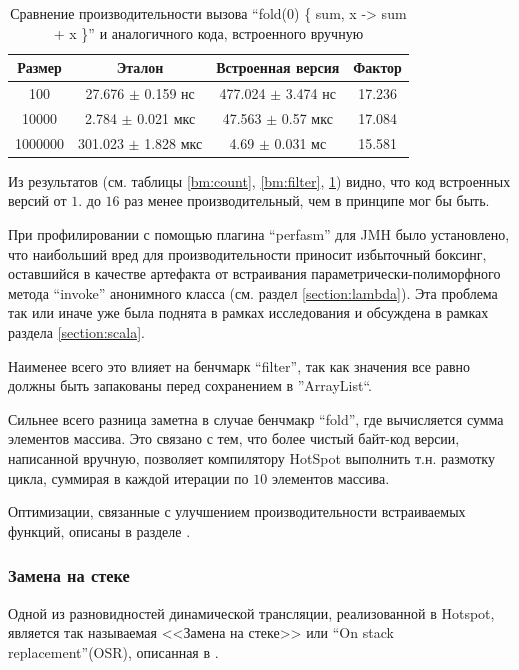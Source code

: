 \begin{table}[h]
\begin{center}
\begin{tabular}{|c|c|c|c|} \hline
Размер & Эталон & Встроенная версия & Фактор \\ \hline
100 & 27.676 $\pm$ 0.159 нс & 477.024 $\pm$ 3.474 нс & 17.236\\ \hline
10000 & 2.784 $\pm$ 0.021 мкс & 47.563 $\pm$ 0.57 мкс & 17.084\\ \hline
1000000 & 301.023 $\pm$ 1.828 мкс & 4.69 $\pm$ 0.031 мс & 15.581\\ \hline
\end{tabular}
\caption{Сравнение производительности вызова ``fold(0) \{ sum, x -> sum + x \}'' и аналогичного кода, встроенного вручную}
\label{bm:fold}
\end{center}
\end{table}

Из результатов (см. таблицы \ref{bm:count}, \ref{bm:filter}, \ref{bm:fold}) видно, что код
встроенных версий от $1.$ до $16$ раз менее производительный, чем в принципе мог бы быть.

При профилировании с помощью плагина ``perfasm'' для JMH было установлено, что наибольший вред
для производительности приносит избыточный боксинг, оставшийся в качестве артефакта от встраивания
параметрически-полиморфного метода ``invoke'' анонимного класса (см. раздел \ref{section:lambda}).
Эта проблема так или иначе уже была поднята в рамках исследования\cite{ScalaDragos} и обсуждена
в рамках раздела \ref{section:scala}.

Наименее всего это влияет на бенчмарк ``filter'', так как значения все равно должны быть запакованы
перед сохранением в ''ArrayList``.

Сильнее всего разница заметна в случае бенчмакр ``fold'', где вычисляется сумма элементов массива.
Это связано с тем, что более чистый байт-код версии, написанной вручную, позволяет компилятору
HotSpot выполнить т.н. размотку цикла, суммирая в каждой итерации по $10$ элементов массива.

Оптимизации, связанные с улучшением производительности встраиваемых функций, описаны в разделе . %

\subsubsection{Замена на стеке}
Одной из разновидностей динамической трансляции, реализованной в Hotspot, является так называемая
<<Замена на стеке>> или ``On stack replacement''(OSR), описанная в \cite{HotspotServer}.

